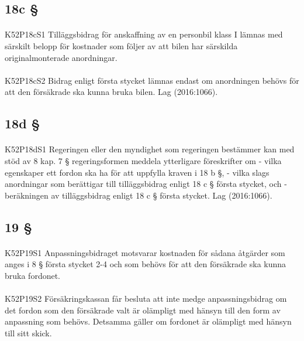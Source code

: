 \documentclass[a4paper,notitlepage,openany,10pt]{book}
\begin{document}
\subsection*{18c §}
\paragraph*{}
{\tiny K52P18cS1}
Tilläggsbidrag för anskaffning av en personbil klass I lämnas med särskilt belopp för kostnader som följer av att bilen har särskilda originalmonterade anordningar.
\paragraph*{}
{\tiny K52P18cS2}
Bidrag enligt första stycket lämnas endast om anordningen behövs för att den försäkrade ska kunna bruka bilen.
Lag (2016:1066).
\subsection*{18d §}
\paragraph*{}
{\tiny K52P18dS1}
Regeringen eller den myndighet som regeringen bestämmer kan med stöd av 8 kap. 7 § regeringsformen meddela ytterligare föreskrifter om
\newline - vilka egenskaper ett fordon ska ha för att uppfylla kraven i 18 b §,
\newline - vilka slags anordningar som berättigar till tilläggsbidrag enligt 18 c § första stycket, och
\newline - beräkningen av tilläggsbidrag enligt 18 c § första stycket.
Lag (2016:1066).
\subsection*{19 §}
\paragraph*{}
{\tiny K52P19S1}
Anpassningsbidraget motsvarar kostnaden för sådana åtgärder som anges i 8 § första stycket 2-4 och som behövs för att den försäkrade ska kunna bruka fordonet.
\paragraph*{}
{\tiny K52P19S2}
Försäkringskassan får besluta att inte medge anpassningsbidrag om det fordon som den försäkrade valt är olämpligt med hänsyn till den form av anpassning som behövs. Detsamma gäller om fordonet är olämpligt med hänsyn till sitt skick.
\end{document}
